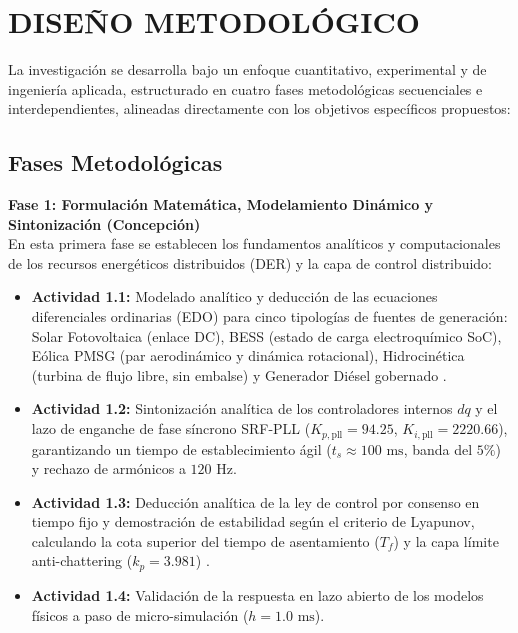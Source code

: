 \section{DISEÑO METODOLÓGICO}
\label{sec:diseno}

La investigación se desarrolla bajo un enfoque cuantitativo, experimental y de ingeniería aplicada, estructurado en cuatro fases metodológicas secuenciales e interdependientes, alineadas directamente con los objetivos específicos propuestos:

\subsection{Fases Metodológicas}

\makeatletter
\newcommand{\act}[1]{\def\@currentlabel{#1}\label{act:#1}#1}
\makeatother

\textbf{Fase 1: Formulación Matemática, Modelamiento Dinámico y Sintonización (Concepción)}\\
En esta primera fase se establecen los fundamentos analíticos y computacionales de los recursos energéticos distribuidos (DER) y la capa de control distribuido:
\begin{itemize}
    \item \textbf{Actividad \act{1.1}:} Modelado analítico y deducción de las ecuaciones diferenciales ordinarias (EDO) para cinco tipologías de fuentes de generación: Solar Fotovoltaica (enlace DC), BESS (estado de carga electroquímico SoC), Eólica PMSG (par aerodinámico y dinámica rotacional), Hidrocinética (turbina de flujo libre, sin embalse) y Generador Diésel gobernado \citep{Kundu2024ICCFPLL, Saadat2010}.
    \item \textbf{Actividad \act{1.2}:} Sintonización analítica de los controladores internos $dq$ y el lazo de enganche de fase síncrono SRF-PLL ($K_{p,\text{pll}} = 94.25$, $K_{i,\text{pll}} = 2220.66$), garantizando un tiempo de establecimiento ágil ($t_s \approx 100\text{ ms}$, banda del $5\%$) y rechazo de armónicos a $120\text{ Hz}$.
    \item \textbf{Actividad \act{1.3}:} Deducción analítica de la ley de control por consenso en tiempo fijo y demostración de estabilidad según el criterio de Lyapunov, calculando la cota superior del tiempo de asentamiento ($T_f$) y la capa límite anti-chattering ($k_p = 3.981$) \citep{Shrivastava2023FiniteTime, Guo2026}.
    \item \textbf{Actividad \act{1.4}:} Validación de la respuesta en lazo abierto de los modelos físicos a paso de micro-simulación ($h = 1.0\text{ ms}$).
\end{itemize}

